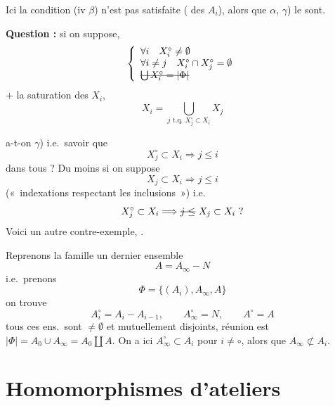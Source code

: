 \documentclass[11pt,a4paper]{article}
\begin{document}
Ici la condition (iv $\beta$) n'est pas satisfaite (\ill{} des $A_i$), alors
que $\alpha$, $\gamma$) le sont.

\textbf{Question :} si on suppose,
\[
\left\{
\begin{array}{l}
\forall i \quad X_i^\circ \neq \emptyset \\
\forall i \neq j \quad X_i^\circ \cap X_j^\circ = \emptyset \\
\text{\struck{$\bigcup X_i^\circ = |\Phi|$}}
\end{array}
\right.
\]
$+$ la saturation des  $X_i$,
\[
X_i = \bigcup_{j \text{ t.q. } X_j^\circ \subset X_i} X_j
\]

a-t-on $\gamma$) i.e.\ savoir que
\[
X_j^\circ \subset X_i \Longrightarrow j \leq i
\]
dans tous ? Du moins si  on suppose
\[
X_j \subset X_i \Longrightarrow j \leq i
\]
(«~indexations respectant les inclusions~»)
i.e.
\[
X_j^\circ \subset X_i \Longrightarrow \text{\struck{$j \leq$}}\ X_j \subset X_i \ ?
\]
Voici un autre contre-exemple,  .
 

Reprenons\add{\uncertain{\,:}} la famille un dernier ensemble
\[
A = A_\infty - N
\]
i.e.\ prenons
\[
\Phi = \{ (A_i), A_\infty, A \}
\]
on trouve
\[
A_i^\circ = A_i - A_{i-1} , \qquad A_\infty^\circ = N , \qquad A^\circ = A
\]
tous ces ens.\ sont $\neq \emptyset$ et mutuellement disjoints, réunion est
$|\Phi| = A_0 \cup A_\infty = A_0 \amalg A$. On a ici $A_\infty^\circ \subset A_i$
pour $i \neq \circ$, alors que
$A_\infty \not\subset A_i$.

\section{Homomorphismes d'ateliers}

\end{document}

